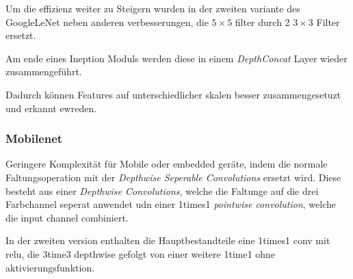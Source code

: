 Um die effizienz weiter zu Steigern wurden in 
der zweiten variante des GoogleLeNet
\cite{szegedyRethinkingInceptionArchitecture2015}
 neben anderen verbesserungen, die 
$ 5\times5$ filter durch 2  $3\times3$ Filter 
ersetzt.

Am ende eines Ineption Moduls werden diese 
in einem \textit{DepthConcat} Layer wieder zusammengeführt.

Dadurch können Features auf unterschiedlicher skalen 
besser zusammengesetuzt und erkannt ewreden.


\vspace{1cm}
\begin{minipage}{0.5\textwidth}
    \centering
    
    \label{fig:incept_modul}
\end{minipage}
\begin{minipage}{0.5\textwidth}
    \centering
    
    \label{fig:incept_modul}
\end{minipage}




\subsubsection{Mobilenet}

\cite{howardMobileNetsEfficientConvolutional2017a}

Geringere Komplexität für Mobile oder embedded geräte, indem 
die normale Faltungsoperation mit der \textit{Depthwise Seperable 
Convolutions} ersetzt wird. 
Diese besteht aus einer \textit{Depthwise  
Convolutions}, welche die Faltunge auf 
die drei Farbchannel seperat anwendet udn einer 1times1
\textit{pointwise convolution}, welche die input channel combiniert. 





In der zweiten version \cite{sandlerMobileNetV2InvertedResiduals2019} enthalten die 
Hauptbestandteile eine 1times1 conv mit relu, die 
3time3 depthwise gefolgt von einer weitere 1time1 ohne aktivierungsfunktion.

